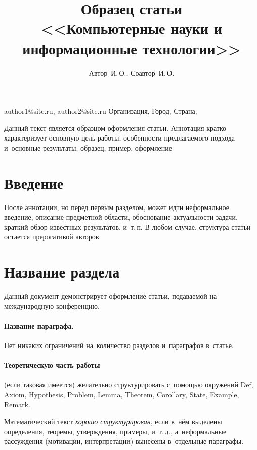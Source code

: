 \documentclass[10pt]{article}
\begin{document}
\title
    {Образец статьи  \\<<Компьютерные науки и информационные технологии>>}
\author
    {Автор~И.\,О., Соавтор~И.\,О.}
\email
    {author1@site.ru, author2@site.ru}
\organization
    {Организация, Город, Страна; }


\abstract
    {Данный текст является образцом оформления статьи.
    Аннотация кратко характеризует основную цель работы,
    особенности предлагаемого подхода и~основные результаты.}
\keywords
    {образец, пример, оформление}

\maketitle

\section*{Введение}
После аннотации, но перед первым разделом,
может идти неформальное введение,
описание предметной области,
обоснование актуальности задачи,
краткий обзор известных результатов,
и~т.\,п. В любом случае, структура статьи остается прерогативой авторов.

\section{Название раздела}
Данный документ демонстрирует оформление статьи,
подаваемой на международную конференцию.

\paragraph{Название параграфа.}

Нет никаких ограничений на~количество разделов и~параграфов в~статье.

\paragraph{Теоретическую часть работы}(если таковая имеется) желательно структурировать
с~помощью окружений
Def, Axiom, Hypothesis, Problem, Lemma, Theorem, Corollary, State, Example, Remark.

\begin{Def}
    Математический текст \emph{хорошо структурирован},
    если в~нём выделены определения, теоремы, утверждения, примеры, и~т.\,д.,
    а~неформальные рассуждения (мотивации, интерпретации)
    вынесены в~отдельные параграфы.
\end{Def}
\end{document}
